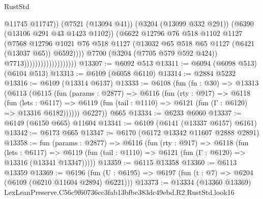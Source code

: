 \begin{lexlean}{RustStd}
\begin{coremodule}
                                                @11745
                                                @11747))
                                            (@7521 (@13094 @41))
                                            (@3204 (@13099 @332 @291))
                                            (@6390 (@13106 @291 @43 @1423 @1102))
                                            (@6622
                                              @12796
                                              @76
                                              @518
                                              @1102
                                              @1127
                                              (@7568
                                                @12796
                                                @1021
                                                @76
                                                @518
                                                @1127
                                                (@13032
                                                  @65
                                                  @518
                                                  @65
                                                  @1127
                                                  (@6421 (@13037 @65))
                                                  @6592))))
                                          @7700
                                          (@3204 (@7705 @579 @592 @424))
                                          @7713)))))))))))))))))))
@13307 := @6092 @513
@13311 := @6094 (@6098 @513) (@6104 @513)
@13313 := @6109 (@6058 @6110)
@13314 := @2884 @5232
@13316 := @6109 (@13314 @6137)
@13333 := @6108
    (fun (fn : @30) =>
    @13313
      (@6113
        (@6115
          (fun (params : @2877) =>
          @6116
            (fun (rty : @917) =>
            @6118
              (fun (lets : @6117) =>
              @6119 (fun (tail : @1110) => @6121 (fun (Γ : @6120) => @13316 @6182))))))
        @6227))
    @665
@13334 := @6233 @6060
@13337 := @6149 (@6150 @665) @11604
@13341 := @6109 (@6141 (@13337 @6157) @6161)
@13342 := @6173 @665
@13347 := @6170 (@6172 @13342 @11607 @2888 @2891)
@13358 := fun (params : @2877) =>
  @6116
    (fun (rty : @917) =>
    @6118
      (fun (lets : @6117) =>
      @6119 (fun (tail : @1110) => @6121 (fun (Γ : @6120) => @13316 (@13341 @13347)))))
@13359 := @6115 @13358
@13360 := @6113 @13359
@13369 := @6196
    (fun (U : @6195) => @6197 (fun (t : @7) => @6204 (@6109 (@6210 @11604 @2894) @6221)))
@13373 := @13334 (@13360 @13369) LexLeanPreserve.C56c9f60736cc3fab13bfbc383dc49ebd.R2.RustStd.look16

\end{coremodule}
\end{lexlean}
